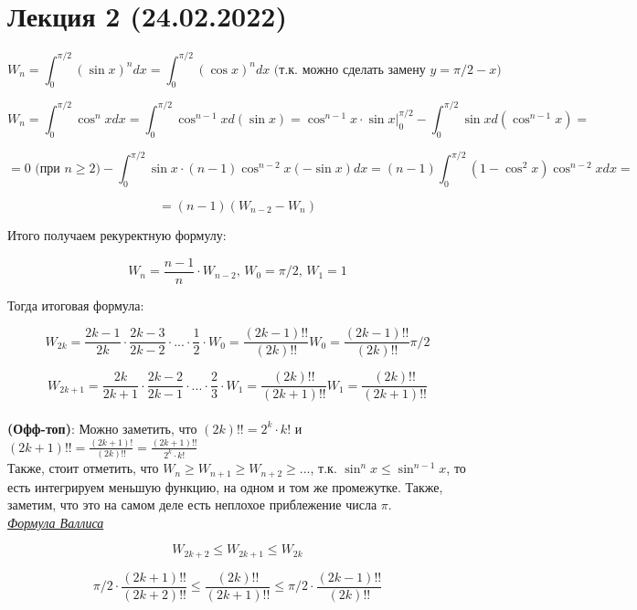\section*{Лекция 2 (24.02.2022)}

\begin{example}

 \[
     W_n = \int_0^{\pi / 2}{(\sin{x})^n} dx = \int_0^{\pi / 2}{(\cos{x})^n}dx \text{ (т.к. можно сделать замену $y = \pi / 2 - x$)} 
\]

\[
    W_n = \int_0^{\pi / 2}\cos^n{x}dx = \int_0^{\pi / 2}\cos^{n - 1}{x} d(\sin{x}) = \cos^{n - 1}{x} \cdot \sin{x} \bigg|_{0}^{\pi/2} - \int_{0}^{\pi / 2}\sin{x} d(\cos^{n - 1}{x}) = 
\]

\[
    = 0 \text{ (при $n \geqslant 2$)} - \int_0^{\pi / 2} \sin{x} \cdot (n - 1) \cos^{n - 2}{x}(-\sin{x}) dx = (n - 1)\int_{0}^{\pi / 2}(1 - \cos^2{x}) \cos^{n - 2}{x} dx = 
\]

\[
    = (n - 1)(W_{n - 2} - W_{n})
\]

Итого получаем рекуректную формулу:

\[
    W_n = \frac{n - 1}{n} \cdot W_{n - 2}, \, W_0 = \pi / 2, \, W_1 = 1
\]

Тогда итоговая формула:

\[
    W_{2k} = \frac{2k - 1}{2k} \cdot \frac{2k - 3}{2k - 2} \cdot ... \cdot \frac{1}{2} \cdot W_0 = \frac{(2k - 1)!!}{(2k)!!} W_0 = \frac{(2k - 1)!!}{(2k)!!} \pi / 2
\]

\[
    W_{2k + 1} = \frac{2k}{2k + 1} \cdot \frac{2k - 2}{2k - 1} \cdot ... \cdot \frac{2}{3} \cdot W_1 = \frac{(2k)!!}{(2k + 1)!!} W_1 = \frac{(2k)!!}{(2k + 1)!!} 
\]
\\

\textbf{(Офф-топ)}: Можно заметить, что $(2k)!! = 2 ^ k \cdot k!$ и $(2k + 1)!! = \frac{(2k + 1)!}{(2k)!!} = \frac{(2k + 1)!!}{2^k \cdot k!}$
\\
\newpage
Также, стоит отметить, что $W_n \geqslant W_{n + 1} \geqslant W_{n + 2} \geqslant ...$, т.к. $\sin^n{x} \leqslant \sin^{n - 1}{x}$, то есть интегрируем меньшую функцию, на одном и том же промежутке.
Также, заметим, что это на самом деле есть неплохое приблежение числа $\pi$.\\

\underline{\textit{Формула Валлиса}}

\[
    W_{2k + 2} \leqslant W_{2k + 1} \leqslant W_{2k}
\]

\[
    \pi / 2 \cdot \frac{(2k + 1)!!}{(2k + 2)!!} \leqslant \frac{(2k)!!}{(2k + 1)!!} \leqslant \pi / 2 \cdot \frac{(2k - 1)!!}{(2k)!!}
\]


\end{example}
